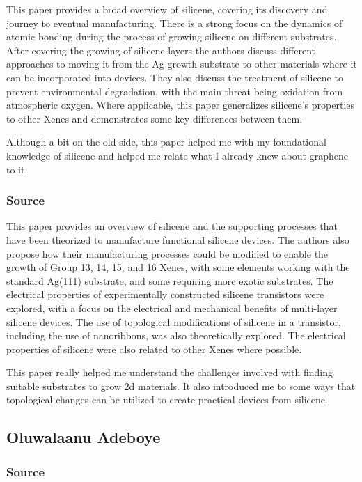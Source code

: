 \documentclass[conference]{IEEEtran}
\begin{document}
This paper provides a broad overview of silicene, covering its discovery and journey to eventual manufacturing. There is a strong focus on the dynamics of atomic bonding during the process of growing silicene on different substrates. After covering the growing of silicene layers the authors discuss different approaches to moving it from the Ag growth substrate to other materials where it can be incorporated into devices. They also discuss the treatment of silicene to prevent environmental degradation, with the main threat being oxidation from atmospheric oxygen. Where applicable, this paper generalizes silicene's properties to other Xenes and demonstrates some key differences between them.

Although a bit on the old side, this paper helped me with my foundational knowledge of silicene and helped me relate what I already knew about graphene to it.

\subsubsection{Source \cite{oc2}}

This paper provides an overview of silicene and the supporting processes that have been theorized to manufacture functional silicene devices. The authors also propose how their manufacturing processes could be modified to enable the growth of Group 13, 14, 15, and 16 Xenes, with some elements working with the standard Ag(111) substrate, and some requiring more exotic substrates. The electrical properties of experimentally constructed silicene transistors were explored, with a focus on the electrical and mechanical benefits of multi-layer silicene devices. The use of topological modifications of silicene in a transistor, including the use of nanoribbons, was also theoretically explored. The electrical properties of silicene were also related to other Xenes where possible.

	This paper really helped me understand the challenges involved with finding suitable substrates to grow 2d materials. It also introduced me to some ways that topological changes can be utilized to create practical devices from silicene.

\subsection{Oluwalaanu Adeboye}

\subsubsection{Source \cite{oa4}}
\end{document}
